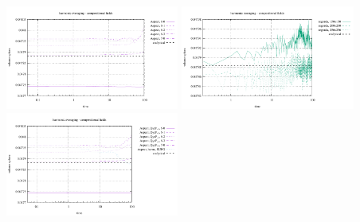 \begin{center}
\includegraphics[width=5.7cm]{images/stokes_sphere_fs2D/vol_sphere_harm_comp}
\includegraphics[width=5.7cm]{images/stokes_sphere_fs2D/vol_sphere_harm_pic}
\includegraphics[width=5.7cm]{images/stokes_sphere_fs2D/vol_sphere_harm_add}
\end{center}


